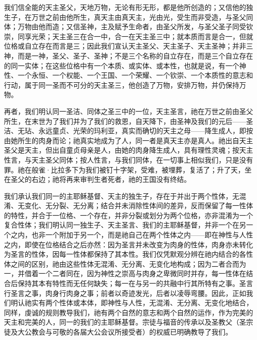 \par

\par

我们信全能的天主圣父，天地万物，无论有形无形，都是他所创造的；又信他的独生子，在万世之前由他所生，真天主由真天主，光由光，受生而非受造，与圣父同体；万物由他而造；又信圣神，主及赋予生命者，由圣父所发，与圣父圣子同受钦崇，同享光荣；天主圣三在合一中，合一在天主圣三中；就本质而言是合一，但就位格或自立存在而言是三；因此我们宣认天主圣父、天主圣子、天主圣神；并非三神，而是一神，圣父、圣子、圣神；不是三个名称的自立存在，而是三个自立存在的同一实体；在这些位格中有一个本质、或实体、或本性，也就是说，有一个神性、一个永恒、一个权能、一个王国、一个荣耀、一个钦崇、一个本质性的意志和行动，属于同一圣而不可分的天主圣三，他创造了万物，安排万物，并仍保持万物。\par

再者，我们明认同一圣洁、同体之圣三中的一位，天主圣言，祂在万世之前由圣父所生，在末世为了我们并为了我们的救恩，自天降下，由圣神及我们的元后——圣洁、无玷、永远童贞、光荣的玛利亚，真实而确切的天主之母——降生成人，即按由她所生的肉身而论；祂真实地成为了人，同一者是真天主亦是真人。祂出自天主圣父是天主，但出自童贞母亲是人，由她的肉身降生成人，具有理性灵魂；按天主性言，与天主圣父同体；按人性言，与我们同体，在一切事上相似我们，只是没有罪。祂在般雀·比拉多下为我们被钉十字架，受难，被埋葬，复活了；升了天，坐在圣父的右边；祂将再来审判生者死者，祂的王国没有终结。\par

我们承认我们同一的主耶稣基督、天主的独生子，存在于并出于两个性体，无混淆、无变化、无分裂、无分离；结合并未消除性体间的差异，反而保留了每一性体的特性，并合于一位格、一个存在，并非分裂或划分为两个位格，亦非混淆为一个复合性体；我们明认同一独生子、天主圣言、我们的主耶稣基督，并非一个在另一个之内，也非一个附加于另一个，而是祂自己在两个性体之内——即在神性与人性之内，即使在位格结合之后亦然：因为圣言并未改变为肉身的性体，肉身亦未转化为圣言的性体，因每一性体都保持了其本性。我们仅凭默观分辨在祂内结合的各性体之间的区别，祂由这些性体无混淆、无分离、无变化地构成；因为二者合而为一，并借着一个二者同在，因为神性之崇高与肉身之卑微同时并存，每一性体在结合后保持其本有特性而无任何缺失；每一在与另一的共融中行其所特有之事。圣言行圣言之事，肉身行肉身之事；前者以奇迹发光，后者以凌辱弯腰。因此，正如我们明认祂实有两个性体或本体，即神性与人性，无混淆、无分离、无变化地结合，同样，虔诚的规则教导我们，祂有两个自然的意志和两个自然的运作，作为完美的天主和完美的人，同一的我们的主耶稣基督。宗徒与福音的传承以及圣教父（圣宗徒及大公教会与可敬的各届大公会议所接受者）的权威已明确教导了我们。\par

